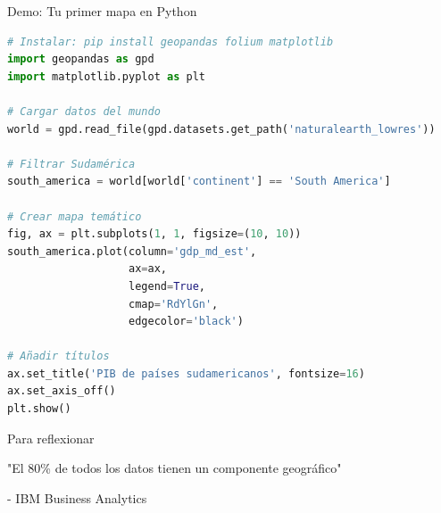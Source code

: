\documentclass[10pt]{beamer}
\begin{document}
\begin{frame}[fragile]{Demo: Tu primer mapa en Python}
    \begin{lstlisting}[language=Python]
# Instalar: pip install geopandas folium matplotlib
import geopandas as gpd
import matplotlib.pyplot as plt

# Cargar datos del mundo
world = gpd.read_file(gpd.datasets.get_path('naturalearth_lowres'))

# Filtrar Sudamérica
south_america = world[world['continent'] == 'South America']

# Crear mapa temático
fig, ax = plt.subplots(1, 1, figsize=(10, 10))
south_america.plot(column='gdp_md_est',
                   ax=ax,
                   legend=True,
                   cmap='RdYlGn',
                   edgecolor='black')

# Añadir títulos
ax.set_title('PIB de países sudamericanos', fontsize=16)
ax.set_axis_off()
plt.show()
    \end{lstlisting}
\end{frame}

\begin{frame}{Para reflexionar}
    \begin{center}
        \Large{\textcolor{usachblue}{"El 80\% de todos los datos tienen un componente geográfico"}}
        
        \vspace{0.5cm}
        \normalsize{- IBM Business Analytics}
        
        \vspace{1cm}
        
    \end{center}
\end{frame}
\end{document}
